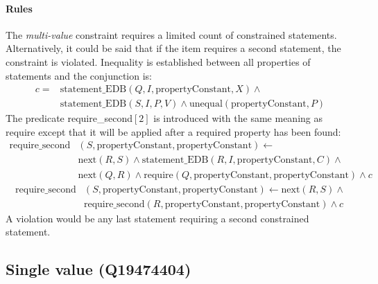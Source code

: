 \documentclass[hyperref,bachelorofscience,fleqn]{cgvpub}
\begin{document}
\paragraph{Rules}
The \emph{multi-value} constraint requires a limited count of constrained statements. Alternatively, it could be said that if the item requires a second statement, the constraint is violated. Inequality is established between all properties of statements and the conjunction is:
\begin{equation*}
\begin{split}
c = &\text{statement\_EDB}(Q, I, \text{propertyConstant}, X) \wedge{} \\
&\text{statement\_EDB}(S, I, P, V) \wedge \text{unequal}(\text{propertyConstant}, P)
\end{split}
\end{equation*}
The predicate require\_second\([2]\) is introduced with the same meaning as require except that it will be applied after a required property has been found:
\begin{equation*}
\begin{split}
\text{require\_second}&(S, \text{propertyConstant}, \text{propertyConstant}) \leftarrow \\
&\text{next}(R, S) \wedge \text{statement\_EDB}(R, I, \text{propertyConstant}, C) \wedge{} \\
&\text{next}(Q, R) \wedge \text{require}(Q, \text{propertyConstant}, \text{propertyConstant})  \wedge c
\end{split}
\end{equation*}
\begin{equation*}
\begin{split}
\text{require\_second}&(S, \text{propertyConstant}, \text{propertyConstant}) \leftarrow \text{next}(R, S) \wedge{} \\
&\text{require\_second}(R, \text{propertyConstant}, \text{propertyConstant}) \wedge c
\end{split}
\end{equation*}
A violation would be any last statement requiring a second constrained statement.\\

\subsection{Single value (Q19474404)}\label{subsec_single_value}
\end{document}
